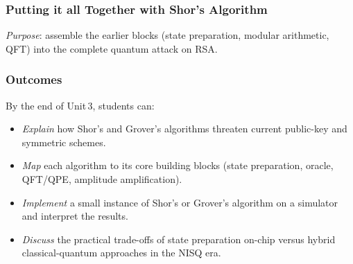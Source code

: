 
\subsubsection{Putting it all Together with Shor's Algorithm}

\emph{Purpose}: assemble the earlier blocks 
(state preparation, modular arithmetic, QFT)
into the complete quantum attack on RSA.



\subsubsection{Outcomes}

By the end of Unit\,3, students can:
\begin{itemize}
	\item \emph{Explain} how Shor's and Grover's algorithms threaten current public-key and symmetric schemes.

	\item \emph{Map} each algorithm to its core building blocks (state preparation, oracle, QFT/QPE, amplitude amplification).

	\item \emph{Implement} a small instance of Shor's or Grover's algorithm on a simulator and interpret the results.

	\item \emph{Discuss} the practical trade-offs of state preparation on-chip versus hybrid classical-quantum approaches in the NISQ era.
\end{itemize}


